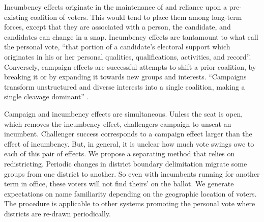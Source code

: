 \documentclass[letter,12pt]{article}
\begin{document}
Incumbency effects originate in the maintenance of and reliance upon a pre-existing coalition of voters. This would tend to place them among long-term forces, except that they are associated with a person, the candidate, and candidates can change in a snap. Incumbency effects are tantamount to what \citet[][:9]{cain.etal.1987} call the personal vote, ``that portion of a candidate's electoral support which originates in his or her personal qualities, qualifications, activities, and record''. Conversely, campaign effects are successful attempts to shift a prior coalition, by breaking it or by expanding it towards new groups and interests. ``Campaigns transform unstructured and diverse interests into a single coalition, making a single cleavage dominant'' \citep[][:12]{popkin.1991}. 





Campaign and incumbency effects are simultaneous. Unless the seat is open, which removes the incumbency effect, challengers campaign to unseat an incumbent. Challenger success corresponds to a campaign effect larger than the effect of incumbency. But, in general, it is unclear how much vote swings owe to each of this pair of effects. We propose a separating method that relies on redistricting. Periodic changes in district boundary delimitation migrate some groups from one district to another. So even with incumbents running for another term in office, these voters will not find theirs' on the ballot. We generate expectations on name familiarity depending on the geographic location of voters. The procedure is applicable to other systems promoting the personal vote \citep{carey.shugart.1995} where districts are re-drawn periodically. 
\end{document}
